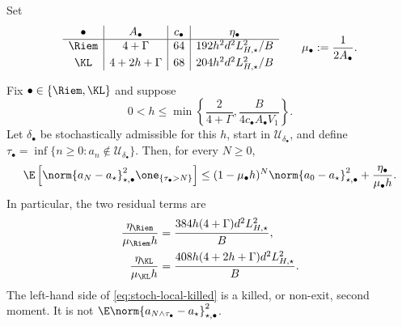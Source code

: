 Set
\begin{equation}
\begin{array}{c|c|c|c}
  \bullet&A_\bullet&c_\bullet&
  \eta_\bullet\\ \hline
  \Riem&4+\Gamma&64&
  192h^2d^2L_{H,\star}^2/B\\[1mm]
  \KL&4+2h+\Gamma&68&
  204h^2d^2L_{H,\star}^2/B
\end{array}
\qquad
\mu_\bullet:=\frac1{2A_\bullet}.
\label{eq:stoch-local-constants}
\end{equation}

\begin{theorem}
\label{thm:stoch-local-killed}
Fix \(\bullet\in\{\Riem,\KL\}\) and suppose
\begin{equation}
  0<h\leq
  \min\left\{
    \frac2{4+\Gamma},
    \frac{B}{4c_\bullet A_\bullet V_1}
  \right\}.
  \label{eq:stoch-local-stepsize}
\end{equation}
Let \(\delta_\bullet\) be stochastically admissible for this \(h\), start
in \(\mathcal U_{\delta_\bullet}\), and define
\(\tau_\bullet=\inf\{n\geq0:a_n\notin
\mathcal U_{\delta_\bullet}\}\).  Then, for every \(N\geq0\),
\begin{equation}
  \E\left[
    \norm{a_N-a_\star}_{\star,\bullet}^2
    \one_{\{\tau_\bullet>N\}}
  \right]
  \leq
  (1-\mu_\bullet h)^N
  \norm{a_0-a_\star}_{\star,\bullet}^2
  +\frac{\eta_\bullet}{\mu_\bullet h}.
  \label{eq:stoch-local-killed}
\end{equation}
In particular, the two residual terms are
\begin{align}
  \frac{\eta_{\Riem}}{\mu_{\Riem}h}
  &=\frac{384h(4+\Gamma)d^2L_{H,\star}^2}{B},
  \label{eq:stoch-local-floor-riemannian}\\
  \frac{\eta_{\KL}}{\mu_{\KL}h}
  &=\frac{408h(4+2h+\Gamma)d^2L_{H,\star}^2}{B}.
  \label{eq:stoch-local-floor-kl}
\end{align}
The left-hand side of \eqref{eq:stoch-local-killed} is a killed, or
non-exit, second moment.  It is not
\(\E\norm{a_{N\wedge\tau_\bullet}-a_\star}_{\star,\bullet}^2\).
\end{theorem}

